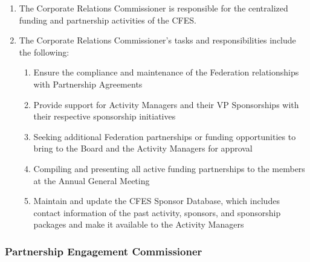 \begin{enumerate}
 \item
  The Corporate Relations Commissioner is responsible for the centralized funding and partnership activities of the CFES.
 \item
  The Corporate Relations Commissioner’s tasks and responsibilities include the following:

  \begin{enumerate}
   \item
    Ensure the compliance and maintenance of the Federation relationships with Partnership Agreements
   \item
    Provide support for Activity Managers and their VP Sponsorships with their respective sponsorship initiatives
   \item
    Seeking additional Federation partnerships or funding opportunities to bring to the Board and the Activity Managers for approval
   \item
    Compiling and presenting all active funding partnerships to the members at the Annual General Meeting
   \item
    Maintain and update the CFES Sponsor Database, which includes contact information of the past activity, sponsors, and sponsorship packages and make it available to the Activity Managers
  \end{enumerate}
\end{enumerate}

\subsubsection{Partnership Engagement Commissioner}
\label{partnership-engagement-commissioner}

